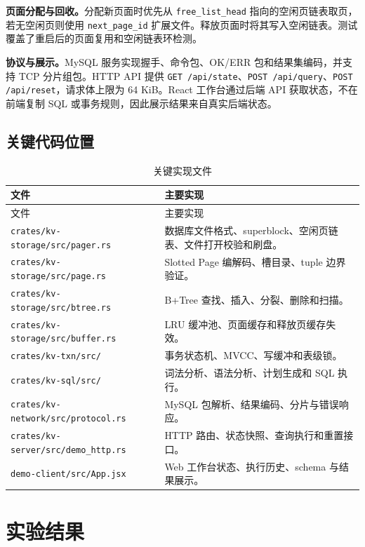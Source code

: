 \documentclass[UTF8,a4paper,12pt]{ctexart}
\newcommand{\code}[1]{\texttt{#1}}
\begin{document}
\textbf{页面分配与回收。}分配新页面时优先从 \code{free\_list\_head} 指向的空闲页链表取页，若无空闲页则使用 \code{next\_page\_id} 扩展文件。释放页面时将其写入空闲链表。测试覆盖了重启后的页面复用和空闲链表环检测。

\textbf{协议与展示。}MySQL 服务实现握手、命令包、OK/ERR 包和结果集编码，并支持 TCP 分片组包。HTTP API 提供 \code{GET /api/state}、\code{POST /api/query}、\code{POST /api/reset}，请求体上限为 64 KiB。React 工作台通过后端 API 获取状态，不在前端复制 SQL 或事务规则，因此展示结果来自真实后端状态。

\subsection{关键代码位置}

\begin{longtable}{>{\raggedright\arraybackslash}p{}>{\raggedright\arraybackslash}p{}}
\caption{关键实现文件}\\
\toprule
文件 & 主要实现\\
\midrule
\endfirsthead
\toprule
文件 & 主要实现\\
\midrule
\endhead
\code{crates/kv-storage/src/pager.rs} & 数据库文件格式、superblock、空闲页链表、文件打开校验和刷盘。\\
\code{crates/kv-storage/src/page.rs} & Slotted Page 编解码、槽目录、tuple 边界验证。\\
\code{crates/kv-storage/src/btree.rs} & B+Tree 查找、插入、分裂、删除和扫描。\\
\code{crates/kv-storage/src/buffer.rs} & LRU 缓冲池、页面缓存和释放页缓存失效。\\
\code{crates/kv-txn/src/} & 事务状态机、MVCC、写缓冲和表级锁。\\
\code{crates/kv-sql/src/} & 词法分析、语法分析、计划生成和 SQL 执行。\\
\code{crates/kv-network/src/protocol.rs} & MySQL 包解析、结果编码、分片与错误响应。\\
\code{crates/kv-server/src/demo\_http.rs} & HTTP 路由、状态快照、查询执行和重置接口。\\
\code{demo-client/src/App.jsx} & Web 工作台状态、执行历史、schema 与结果展示。\\
\bottomrule
\end{longtable}

\section{实验结果}
\end{document}

